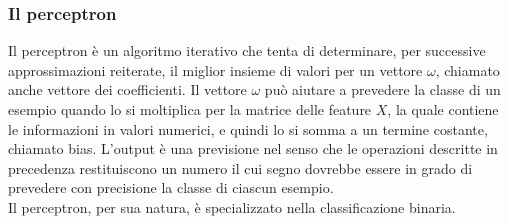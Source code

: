 \begin{frame}
	
	\frametitle{Il perceptron}

		Il perceptron è un algoritmo iterativo che tenta di determinare, per successive approssimazioni reiterate, il miglior insieme di valori per un vettore $\omega$, chiamato anche vettore dei coefficienti.
		\newlinedouble
		Il vettore $\omega$ può aiutare a prevedere la classe di un esempio quando lo si moltiplica per la matrice delle feature $X$, la quale contiene le informazioni in valori numerici, e quindi lo si somma a un termine costante, chiamato bias.
		\newlinedouble
		L'output è una previsione nel senso che le operazioni descritte in precedenza restituiscono un numero il cui segno dovrebbe essere in grado di prevedere con precisione la classe di ciascun esempio.\\
		Il perceptron, per sua natura, è specializzato nella classificazione binaria.
		

\end{frame}



